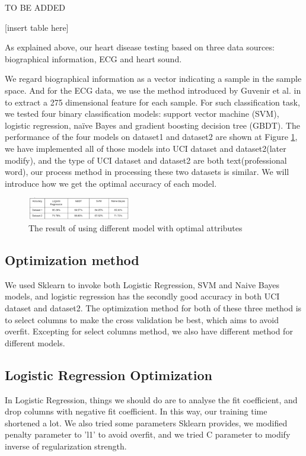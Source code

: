 \documentclass[letterpaper]{article} %
\begin{document}
TO BE ADDED

[insert table here]

As explained above, our heart disease testing based on three data sources: biographical information, ECG and heart sound.

We regard biographical information as a vector indicating a sample in the sample space. And for the ECG data, we use the method introduced by Guvenir et al. in \cite{ECG} to extract a 275 dimensional feature for each sample.  For such classification task, we tested four binary classification models: support vector machine (SVM), logistic regression, naïve Bayes and gradient boosting decision tree (GBDT). 
The performance of the four models on dataset1 and dataset2 are shown at Figure \ref{fig:dataset-1-comparison}, we have implemented all of those models into UCI dataset and dataset2(later modify), and the type of UCI dataset and dataset2 are both text(professional word), our process method in processing these two datasets is similar. We will introduce how we get the optimal accuracy of each model.

\begin{figure}[!htbp]
\centering\includegraphics[width=0.4\textwidth]{dataset-1-comparison}
\caption{The result of using different model with optimal attributes}
\label{fig:dataset-1-comparison}
\end{figure}

\subsection{Optimization method}

We used Sklearn to invoke both Logistic Regression, SVM and Naive Bayes models, and logistic regression has the secondly good accuracy in both UCI dataset and dataset2. The optimization method for both of these three method is to select columns to make the cross validation be best, which aims to avoid overfit. Excepting for select columns method, we also have different method for different models.

\subsection{Logistic Regression Optimization}

In Logistic Regression, things we should do are to analyse the fit coefficient, and drop columns with negative fit coefficient. In this way, our training time shortened a lot. We also tried some parameters Sklearn provides, we modified penalty parameter to 'l1' to avoid overfit, and we tried C parameter to modify inverse of regularization strength.
\end{document}

